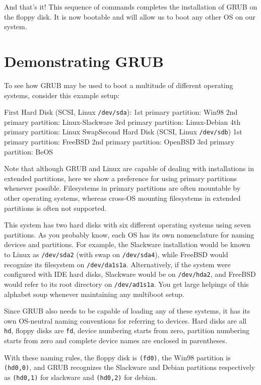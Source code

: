 \documentclass{article}
\begin{document}
And that's it! This sequence of commands completes the installation of GRUB on the floppy disk. It is now bootable and will allow us to boot any other OS on our system.











\section{Demonstrating GRUB}

To see how GRUB may be used to boot a multitude of different operating systems, consider this example setup:

First Hard Disk (SCSI, Linux \texttt{/dev/sda}): 1st primary partition: Win98 2nd primary partition: Linux-Slackware 3rd primary partition: Linux-Debian 4th primary partition: Linux SwapSecond Hard Disk (SCSI, Linux \texttt{/dev/sdb}) 1st primary partition: FreeBSD 2nd primary partition: OpenBSD 3rd primary partition: BeOS

Note that although GRUB and Linux are capable of dealing with installations in extended partitions, here we show a preference for using primary partitions whenever possible. Filesystems in primary partitions are often mountable by other operating systems, whereas cross-OS mounting filesystems in extended partitions is often not supported.

This system has two hard disks with six different operating systems using seven partitions. As you probably know, each OS has its own nomenclature for naming devices and partitions.
For example, the Slackware installation would be known to Linux as \texttt{/dev/sda2} (with swap on \texttt{/dev/sda4}),
while FreeBSD would recognize its filesystem on \texttt{/dev/da1s1a}.
Alternatively, if the system were configured with IDE hard disks, Slackware would be on \texttt{/dev/hda2},
and FreeBSD would refer to its root directory on \texttt{/dev/ad1s1a}.
You get large helpings of this alphabet soup whenever maintaining any multiboot setup.

Since GRUB also needs to be capable of loading any of these systems, it has its own OS-neutral naming conventions for referring to devices.
Hard disks are all \texttt{hd},
floppy disks are \texttt{fd},
device numbering starts from zero, partition numbering starts from zero and complete device names are enclosed in parentheses.

With these naming rules, the floppy disk is \texttt{(fd0)},
the Win98 partition is \texttt{(hd0,0)},
and GRUB recognizes the Slackware and Debian partitions respectively
as \texttt{(hd0,1)} for slackware and \texttt{(hd0,2)} for debian.
\end{document}
